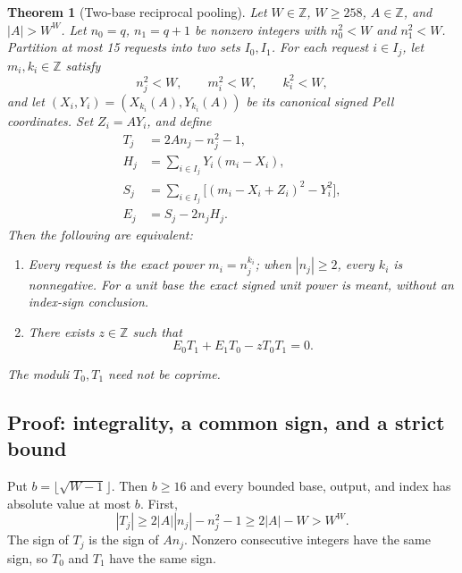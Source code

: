 \documentclass[11pt,letterpaper]{article}
\newtheorem{theorem}{Theorem}[section]
\theoremstyle{definition}\newtheorem{definition}[theorem]{Definition}
\theoremstyle{remark}\newtheorem{remark}[theorem]{Remark}
\newcommand{\Z}{\mathbb Z}\newcommand{\N}{\mathbb N}
\begin{document}
\begin{theorem}[Two-base reciprocal pooling]\label{thm:pool}
Let $W\in\Z$, $W\ge258$, $A\in\Z$, and $|A|>W^W$. Let
$n_0=q$, $n_1=q+1$ be nonzero integers with $n_0^2<W$ and $n_1^2<W$. Partition at most 15 requests
into two sets $I_0,I_1$. For each request $i\in I_j$, let
$m_i,k_i\in\Z$ satisfy
\[
 n_j^2<W,\qquad m_i^2<W,\qquad k_i^2<W,
\]
and let $(X_i,Y_i)=(X_{k_i}(A),Y_{k_i}(A))$ be its canonical signed
Pell coordinates. Set $Z_i=AY_i$, and define
\begin{align*}
 T_j&=2An_j-n_j^2-1,\\
 H_j&=\sum_{i\in I_j}Y_i(m_i-X_i),\\
 S_j&=\sum_{i\in I_j}\bigl[(m_i-X_i+Z_i)^2-Y_i^2\bigr],\\
 E_j&=S_j-2n_jH_j.
\end{align*}
Then the following are equivalent:
\begin{enumerate}[label=(\alph*)]
\item Every request is the exact power $m_i=n_j^{k_i}$; when $|n_j|\ge2$,
 every $k_i$ is nonnegative. For a unit base the exact signed unit power
 is meant, without an index-sign conclusion.
\item There exists $z\in\Z$ such that
\begin{equation}\label{eq:RP}
 \boxed{E_0T_1+E_1T_0-zT_0T_1=0.}
\end{equation}
\end{enumerate}
The moduli $T_0,T_1$ need not be coprime.
\end{theorem}

\subsection{Proof: integrality, a common sign, and a strict bound}

Put $b=\lfloor\sqrt{W-1}\rfloor$. Then $b\ge16$ and every bounded
base, output, and index has absolute value at most $b$. First,
\begin{equation}\label{eq:Tbound}
 |T_j|\ge2|A||n_j|-n_j^2-1\ge2|A|-W>W^W.
\end{equation}
The sign of $T_j$ is the sign of $An_j$. Nonzero consecutive integers
have the same sign, so $T_0$ and $T_1$ have the same sign.
\end{document}
